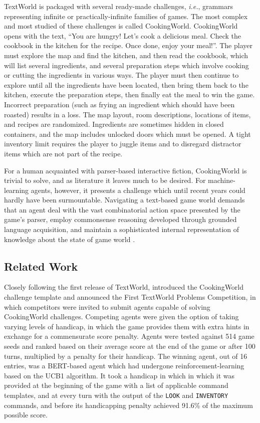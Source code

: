 \documentclass{article}
\begin{document}
TextWorld is packaged with several ready-made challenges, \textit{i.e.},
grammars representing infinite or practically-infinite families of games. The
most complex and most studied of these challenges is called CookingWorld.
CookingWorld opens with the text, ``You are hungry! Let's cook a delicious meal.
Check the cookbook in the kitchen for the recipe. Once done, enjoy your meal!''.
The player must explore the map and find the kitchen, and then read the
cookbook, which will list several ingredients, and several preparation steps
which involve cooking or cutting the ingredients in various ways. The player
must then continue to explore until all the ingredients have been located, then
bring them back to the kitchen, execute the preparation steps, then finally
eat the meal to win the game. Incorrect preparation (such as frying an
ingredient which should have been roasted) results in a loss. The map layout,
room descriptions, locations of items, and recipes are randomized. Ingredients
are sometimes hidden in closed containers, and the map includes unlocked doors
which must be opened. A tight inventory limit requires the player to juggle
items and to disregard distractor items which are not part of the recipe.

For a human acquainted with parser-based interactive fiction, CookingWorld is
trivial to solve, and as literature it leaves much to be desired. For
machine-learning agents, however, it presents a challenge which until recent
years could hardly have been surmountable. Navigating a text-based game world
demands that an agent deal with the vast combinatorial action space presented by
the game's parser, employ commonsense reasoning developed through grounded
language acquisition, and maintain a sophisticated internal representation of
knowledge about the state of game world \autocite{Hausknecht2019InteractiveFG}.

\subsection{Related Work}

Closely following the first release of TextWorld,
\autocite{Trischler2019FirstTW} introduced the CookingWorld challenge template
and announced the First TextWorld Problems Competition, in which competitors
were invited to submit agents capable of solving CookingWorld challenges.
Competing agents were given the option of taking varying levels of handicap, in
which the game provides them with extra hints in exchange for a commensurate
score penalty. Agents were tested against 514 game seeds and ranked based on
their average score at the end of the game or after 100 turns, multiplied by a
penalty for their handicap. The winning agent, out of 16 entries, was a
BERT-based \autocite{Devlin2019Bert} agent which had undergone
reinforcement-learning based on the UCB1 \autocite{Auer2002UCB1} algorithm. It
took a handicap in which in which it was provided at the beginning of the game
with a list of applicable command templates, and at every turn with the output
of the \texttt{LOOK} and \texttt{INVENTORY} commands, and before its
handicapping penalty achieved 91.6\% of the maximum possible score.
\end{document}
